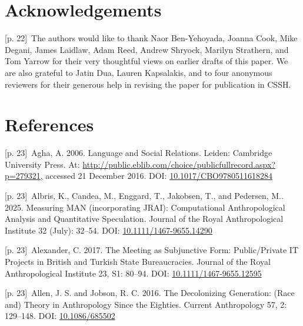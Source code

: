 \documentclass[10pt,a4paper]{article}
\begin{document}
\section*{Acknowledgements}
{\scriptsize\color{gray} [p. 22]}\ The authors would like to thank Naor Ben-Yehoyada, Joanna Cook, Mike Degani, James Laidlaw, Adam Reed, Andrew Shryock, Marilyn Strathern, and Tom Yarrow for their very thoughtful views on earlier drafts of this paper. We are also grateful to Jatin Dua, Lauren Kapsalakis, and to four anonymous reviewers for their generous help in revising the paper for publication in CSSH.\par
{}\section*{References}
\noindent\begin{minipage}[t]{\linewidth}{\scriptsize\color{gray} [p. 23]}\ Agha, A. 2006. Language and Social Relations. Leiden: Cambridge University Press. At: \url{http://public.eblib.com/choice/publicfullrecord.aspx?p=279321,} accessed 21 December 2016. DOI: \url{10.1017/CBO9780511618284}\par\end{minipage}\par
\noindent\begin{minipage}[t]{\linewidth}{\scriptsize\color{gray} [p. 23]}\ Albris, K., Candea, M., Enggard, T., Jakobsen, T., and Pedersen, M.. 2025. Measuring MAN (incorporating JRAI): Computational Anthropological Analysis and Quantitative Speculation. Journal of the Royal Anthropological Institute 32 (July): 32–54. DOI: \url{10.1111/1467-9655.14290}\par\end{minipage}\par
\noindent\begin{minipage}[t]{\linewidth}{\scriptsize\color{gray} [p. 23]}\ Alexander, C. 2017. The Meeting as Subjunctive Form: Public/Private IT Projects in British and Turkish State Bureaucracies. Journal of the Royal Anthropological Institute 23, S1: 80–94. DOI: \url{10.1111/1467-9655.12595}\par\end{minipage}\par
\noindent\begin{minipage}[t]{\linewidth}{\scriptsize\color{gray} [p. 23]}\ Allen, J. S. and Jobson, R. C. 2016. The Decolonizing Generation: (Race and) Theory in Anthropology Since the Eighties. Current Anthropology 57, 2: 129–148. DOI: \url{10.1086/685502}\par\end{minipage}\par
\end{document}
